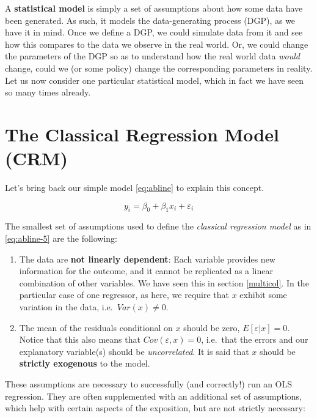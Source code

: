 \documentclass[]{book}
\providecommand{\tightlist}{%
  \setlength{\itemsep}{0pt}\setlength{\parskip}{0pt}}
\begin{document}
A \textbf{statistical model} is simply a set of assumptions about how some data have been generated. As such, it models the data-generating process (DGP), as we have it in mind. Once we define a DGP, we could simulate data from it and see how this compares to the data we observe in the real world. Or, we could change the parameters of the DGP so as to understand how the real world data \emph{would} change, could we (or some policy) change the corresponding parameters in reality. Let us now consider one particular statistical model, which in fact we have seen so many times already.

\hypertarget{class-reg}{%
\section{The Classical Regression Model (CRM)}\label{class-reg}}

Let's bring back our simple model \eqref{eq:abline} to explain this concept.

\begin{equation}
y_i = \beta_0 + \beta_1 x_i + \varepsilon_i \label{eq:abline-5}
\end{equation}

The smallest set of assumptions used to define the \emph{classical regression model} as in \eqref{eq:abline-5} are the following:

\begin{enumerate}
\def\labelenumi{\arabic{enumi}.}
\tightlist
\item
  The data are \textbf{not linearly dependent}: Each variable provides new information for the outcome, and it cannot be replicated as a linear combination of other variables. We have seen this in section \ref{multicol}. In the particular case of one regressor, as here, we require that \(x\) exhibit some variation in the data, i.e.~\(Var(x)\neq 0\).
\item
  The mean of the residuals conditional on \(x\) should be zero, \(E[\varepsilon|x] = 0\). Notice that this also means that \(Cov(\varepsilon,x) = 0\), i.e.~that the errors and our explanatory variable(s) should be \emph{uncorrelated}. It is said that \(x\) should be \textbf{strictly exogenous} to the model.
\end{enumerate}

These assumptions are necessary to successfully (and correctly!) run an OLS regression. They are often supplemented with an additional set of assumptions, which help with certain aspects of the exposition, but are not strictly necessary:
\end{document}
